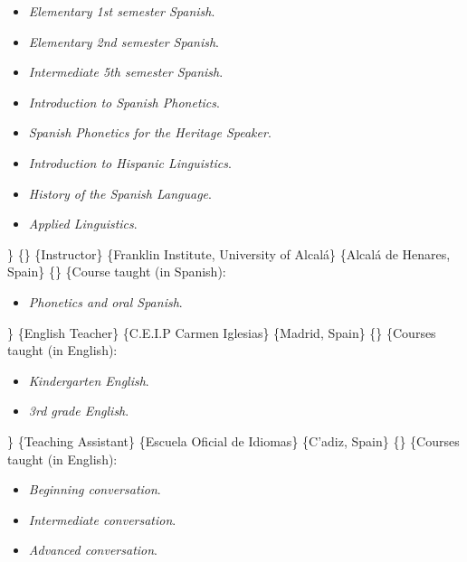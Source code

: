 \documentclass[11pt,letterpaper]{moderncv}
\begin{document}
\begin{itemize}
          \item[] \small \emph{Elementary 1st semester Spanish}.\vspace{-.03in}
          \item[] \small \emph{Elementary 2nd semester Spanish}.\vspace{-.03in}
          \item[] \small \emph{Intermediate 5th semester Spanish}.\vspace{-.03in}
          \item[] \small \emph{Introduction to Spanish Phonetics}.\vspace{-.03in}
          \item[] \small \emph{Spanish Phonetics for the Heritage Speaker}.\vspace{-.03in}
          \item[] \small \emph{Introduction to Hispanic Linguistics}.\vspace{-.03in}
          \item[] \small \emph{History of the Spanish Language}.\vspace{-.03in}
          \item[] \small \emph{Applied Linguistics}.
        \end{itemize}

\} \{\}  \{Instructor\} \{Franklin Institute,
University of Alcalá\} \{Alcalá de Henares, Spain\} \{\} \{Course taught
(in Spanish):

\begin{itemize}
          \item[] \small \emph{Phonetics and oral Spanish}.
        \end{itemize}

\}  \{English Teacher\} \{C.E.I.P Carmen
Iglesias\} \{Madrid, Spain\} \{\} \{Courses taught (in English):

\begin{itemize}
          \item[] \small \emph{Kindergarten English}.\vspace{-.03in}
          \item[] \small \emph{3rd grade English}.
        \end{itemize}

\}  \{Teaching Assistant\} \{Escuela Oficial de
Idiomas\} \{C'adiz, Spain\} \{\} \{Courses taught (in English):

\begin{itemize}
          \item[] \small \emph{Beginning conversation}.\vspace{-.03in}
          \item[] \small \emph{Intermediate conversation}.\vspace{-.03in}
          \item[] \small \emph{Advanced conversation}.
        \end{itemize}
\end{document}
